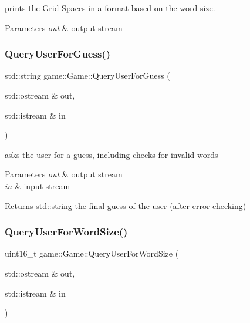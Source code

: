 prints the Grid Spaces in a format based on the word size. 


\begin{DoxyParams}{Parameters}
{\em out} & output stream \\
\hline
\end{DoxyParams}
\mbox{\label{classgame_1_1Game_a4a16bdf4073caea5efc9c4b70b1b969f}} 
\subsubsection{\texorpdfstring{Query\+User\+For\+Guess()}{QueryUserForGuess()}}
{\footnotesize\ttfamily std\+::string game\+::\+Game\+::\+Query\+User\+For\+Guess (\begin{DoxyParamCaption}\item[{std\+::ostream \&}]{out,  }\item[{std\+::istream \&}]{in }\end{DoxyParamCaption})}



asks the user for a guess, including checks for invalid words 


\begin{DoxyParams}{Parameters}
{\em out} & output stream \\
\hline
{\em in} & input stream \\
\hline
\end{DoxyParams}
\begin{DoxyReturn}{Returns}
std\+::string the final guess of the user (after error checking) 
\end{DoxyReturn}
\mbox{\label{classgame_1_1Game_a3352c8a498b17b0a374d4a696fc2abdf}} 
\subsubsection{\texorpdfstring{Query\+User\+For\+Word\+Size()}{QueryUserForWordSize()}}
{\footnotesize\ttfamily uint16\+\_\+t game\+::\+Game\+::\+Query\+User\+For\+Word\+Size (\begin{DoxyParamCaption}\item[{std\+::ostream \&}]{out,  }\item[{std\+::istream \&}]{in }\end{DoxyParamCaption})}



